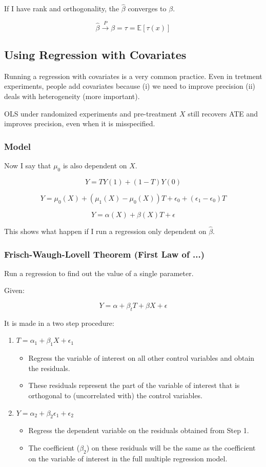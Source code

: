 \documentclass{article}
\begin{document}
If I have rank and orthogonality, the $\hat{\beta}$ converges to $\beta$.

$$
\hat{\beta} \xrightarrow{P} \beta = \tau = \mathbb{E}[\tau(x)]
$$

\subsection{Using Regression with Covariates}
Running a regression with covariates is a very common practice. Even in tretment experiments, people add covariates because (i) we need to improve precision (ii) deals with heterogeneity (more important).

OLS under randomized experiments and pre-treatment $X$ still recovers ATE and improves precision, even when it is misspecified.

\subsubsection{Model}
Now I say that $\mu_0$ is also dependent on $X$.

$$
Y = T Y(1) + (1-T)Y(0)
$$

$$
Y= \mu_0(X) + (\mu_1(X) - \mu_0(X)) T + \epsilon_0 + (\epsilon_1 - \epsilon_0) T
$$

$$
Y = \alpha(X) + \beta(X) T + \epsilon
$$

This shows what happen if I run a regression only dependent on $\hat{\beta}$.

\subsubsection{Frisch-Waugh-Lovell Theorem (First Law of ...)}
Run a regression to find out the value of a single parameter.

Given:

$$
Y = \alpha + \beta_t T + \beta X + \epsilon
$$

It is made in a two step procedure:
\begin{enumerate}
    \item $T = \alpha_1 + \beta_1 X + \epsilon_1$
    \begin{itemize}
        \item Regress the variable of interest on all other control variables and obtain the residuals.
        \item These residuals represent the part of the variable of interest that is orthogonal to (uncorrelated with) the control variables.
    \end{itemize}
    \item $Y = \alpha_2 + \beta_2 \epsilon_1 + \epsilon_2$
    \begin{itemize}
        \item Regress the dependent variable on the residuals obtained from Step 1.
        \item The coefficient ($\beta_2$) on these residuals will be the same as the coefficient on the variable of interest in the full multiple regression model.
    \end{itemize}
\end{enumerate}
\end{document}
